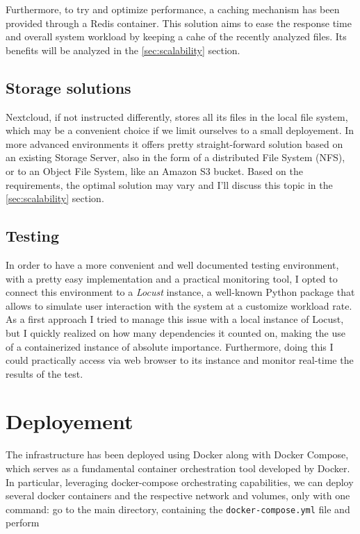 \documentclass{article}
\begin{document}
	Furthermore, to try and optimize performance, a caching mechanism has been provided through a Redis container. This solution aims to ease the response time and overall system workload by keeping a cahe of the recently analyzed files. Its benefits will be analyzed in the \ref*{sec:scalability} section.
	
	\subsection{Storage solutions}
	Nextcloud, if not instructed differently, stores all its files in the local file system, which may be a convenient choice if we limit ourselves to a small deployement. In more advanced environments it offers pretty straight-forward solution based on an existing Storage Server, also in the form of a distributed File System (NFS), or to an Object File System, like an Amazon S3 bucket. Based on the requirements, the optimal solution may vary and I'll discuss this topic in the \ref{sec:scalability} section.
	
	\subsection{Testing}
	In order to have a more convenient and well documented testing environment, with a pretty easy implementation and a practical monitoring tool, I opted to connect this environment to a \textit{Locust} instance, a well-known Python package that allows to simulate user interaction with the system at a customize workload rate. As a first approach I tried to manage this issue with a local instance of Locust, but I quickly realized on how many dependencies it counted on, making the use of a containerized instance of absolute importance. Furthermore, doing this I could practically access via web browser to its instance and monitor real-time the results of the test.
	
	\section{Deployement}
	\label{sec:deployement}
	
	The infrastructure has been deployed using Docker along with Docker Compose, which serves as a fundamental container orchestration tool developed by Docker.
	In particular, leveraging docker-compose orchestrating capabilities, we can deploy several docker containers and the respective network and volumes, only with one command: go to the main directory, containing the \verb|docker-compose.yml| file and perform
	
\end{document}
